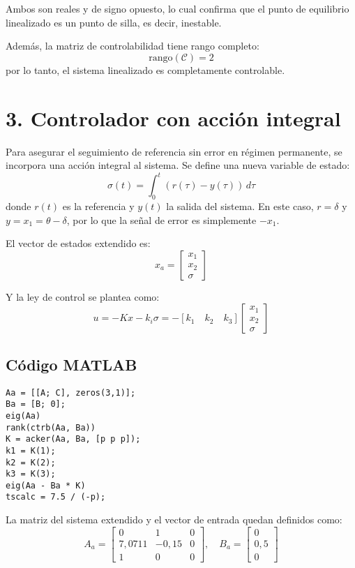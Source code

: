 \documentclass[11pt]{article}
\begin{document}
Ambos son reales y de signo opuesto, lo cual confirma que el punto de equilibrio linealizado es un punto de silla, es decir, inestable.


Además, la matriz de controlabilidad tiene rango completo:
\[
\text{rango}(\mathcal{C}) = 2
\]
por lo tanto, el sistema linealizado es completamente controlable.

\section*{3. Controlador con acción integral}
Para asegurar el seguimiento de referencia sin error en régimen permanente, se incorpora una acción integral al sistema. Se define una nueva variable de estado:
\[
\sigma(t) = \int_0^t (r(\tau) - y(\tau)) \, d\tau
\]
donde \( r(t) \) es la referencia y \( y(t) \) la salida del sistema. En este caso, \( r = \delta \) y \( y = x_1 = \theta - \delta \), por lo que la señal de error es simplemente \( -x_1 \).

El vector de estados extendido es:
\[
x_a = \begin{bmatrix} x_1 \\ x_2 \\ \sigma \end{bmatrix}
\]

Y la ley de control se plantea como:
\[
u = -Kx - k_i \sigma = -[k_1 \quad k_2 \quad k_3] \begin{bmatrix} x_1 \\ x_2 \\ \sigma \end{bmatrix}
\]

\subsection*{Código MATLAB}
\begin{lstlisting}
Aa = [[A; C], zeros(3,1)];
Ba = [B; 0];
eig(Aa)
rank(ctrb(Aa, Ba))
K = acker(Aa, Ba, [p p p]);
k1 = K(1);
k2 = K(2);
k3 = K(3);
eig(Aa - Ba * K)
tscalc = 7.5 / (-p);
\end{lstlisting}


La matriz del sistema extendido y el vector de entrada quedan definidos como:
\[
A_a = \begin{bmatrix}
0 & 1 & 0 \\
7{,}0711 & -0{,}15 & 0 \\
1 & 0 & 0
\end{bmatrix}, \quad
B_a = \begin{bmatrix}
0 \\ 0{,}5 \\ 0
\end{bmatrix}
\]
\end{document}
